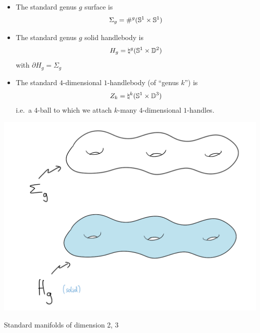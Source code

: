 \begin{definition}
	\begin{itemize}
		\item The standard genus $g$ surface is
		\[
			\Sigma_g = {\#}^{g} (\mathbb{S}^{1} \times \mathbb{S}^{1})
		\]
		\item The standard genus $g$ solid handlebody is
		\[
			H_g = \natural^g (\mathbb{S}^{1} \times \mathbb{D}^{2})
		\]
		with $\partial H_{g} = \Sigma_{g}$
		
		\item The standard $4$-dimensional $1$-handlebody
		(of ``genus $k$'') is
		\[
			Z_{k} =\natural^{k} (\mathbb{S}^{1} \times \mathbb{D}^{3})
		\]
		i.e.\ a $4$-ball to which we attach $k$-many
		$4$-dimensional $1$-handles.
	\end{itemize}
\end{definition}
\begin{marginfigure}
	\begin{center}
		\includegraphics{./pictures/standard_manifolds.png}
	\end{center}
	\caption{Standard manifolds of dimension 2, 3}
	\label{fig:standard_manifolds}
\end{marginfigure}
